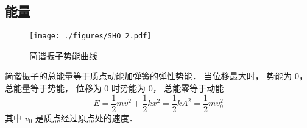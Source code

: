 \subsection{能量}

\begin{figure}[ht]
\centering
\texttt{[image: ./figures/SHO\_2.pdf]}
\caption{简谐振子势能曲线} \label{SHO_fig2}
\end{figure}

简谐振子的总能量等于质点动能加弹簧的弹性势能． 当位移最大时， 势能为 0， 总能量等于势能， 位移为 0 时势能为 0， 总能零等于动能
\begin{equation}
E = \frac{1}{2} mv^2 + \frac12 k x^2 = \frac12 k A^2 = \frac12 m v_0^2
\end{equation}
其中 $v_0$ 是质点经过原点处的速度．
